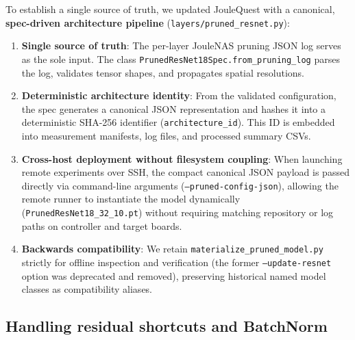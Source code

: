 To establish a single source of truth, we updated JouleQuest with a canonical, \textbf{spec-driven architecture pipeline} (\texttt{layers/pruned\_resnet.py}):
\begin{enumerate}
    \item \textbf{Single source of truth}: The per-layer JouleNAS pruning JSON log serves as the sole input. The class \texttt{PrunedResNet18Spec.from\_pruning\_log} parses the log, validates tensor shapes, and propagates spatial resolutions.
    \item \textbf{Deterministic architecture identity}: From the validated configuration, the spec generates a canonical JSON representation and hashes it into a deterministic SHA-256 identifier (\texttt{architecture\_id}). This ID is embedded into measurement manifests, log files, and processed summary CSVs.
    \item \textbf{Cross-host deployment without filesystem coupling}: When launching remote experiments over SSH, the compact canonical JSON payload is passed directly via command-line arguments (\texttt{--pruned-config-json}), allowing the remote runner to instantiate the model dynamically (\texttt{PrunedResNet18\_32\_10.pt}) without requiring matching repository or log paths on controller and target boards.
    \item \textbf{Backwards compatibility}: We retain \texttt{materialize\_pruned\_model.py} strictly for offline inspection and verification (the former \texttt{--update-resnet} option was deprecated and removed), preserving historical named model classes as compatibility aliases.
\end{enumerate}

\subsection{Handling residual shortcuts and BatchNorm}

